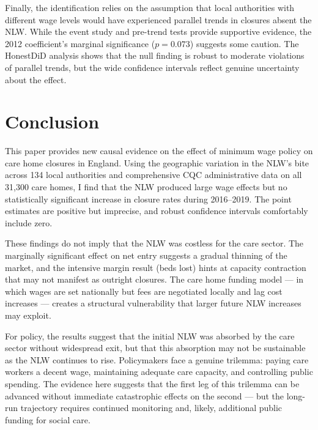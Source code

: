 \documentclass[12pt]{article}
\begin{document}
Finally, the identification relies on the assumption that local authorities with different wage levels would have experienced parallel trends in closures absent the NLW. While the event study and pre-trend tests provide supportive evidence, the 2012 coefficient's marginal significance ($p = 0.073$) suggests some caution. The HonestDiD analysis shows that the null finding is robust to moderate violations of parallel trends, but the wide confidence intervals reflect genuine uncertainty about the effect.


\section{Conclusion}
\label{sec:conclusion}

This paper provides new causal evidence on the effect of minimum wage policy on care home closures in England. Using the geographic variation in the NLW's bite across 134 local authorities and comprehensive CQC administrative data on all 31,300 care homes, I find that the NLW produced large wage effects but no statistically significant increase in closure rates during 2016--2019. The point estimates are positive but imprecise, and robust confidence intervals comfortably include zero.

These findings do not imply that the NLW was costless for the care sector. The marginally significant effect on net entry suggests a gradual thinning of the market, and the intensive margin result (beds lost) hints at capacity contraction that may not manifest as outright closures. The care home funding model --- in which wages are set nationally but fees are negotiated locally and lag cost increases --- creates a structural vulnerability that larger future NLW increases may exploit.

For policy, the results suggest that the initial NLW was absorbed by the care sector without widespread exit, but that this absorption may not be sustainable as the NLW continues to rise. Policymakers face a genuine trilemma: paying care workers a decent wage, maintaining adequate care capacity, and controlling public spending. The evidence here suggests that the first leg of this trilemma can be advanced without immediate catastrophic effects on the second --- but the long-run trajectory requires continued monitoring and, likely, additional public funding for social care.
\end{document}
